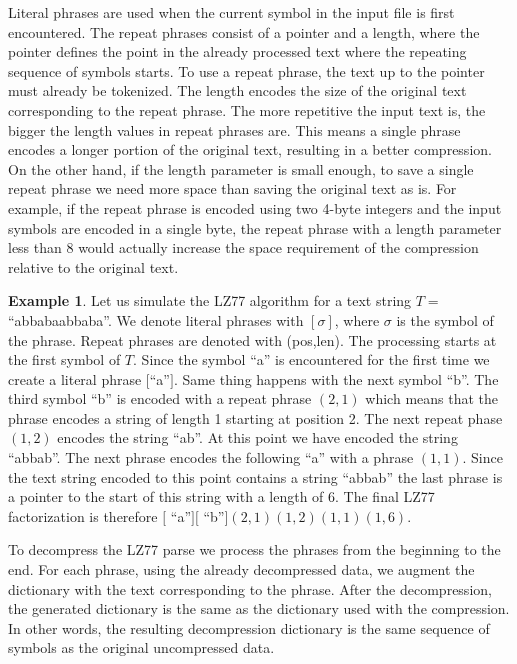 \documentclass[english,twoside,censored,csm,algorithms-track-2020]{HYthesisML}
\theoremstyle{plain}
\theoremstyle{definition}
\newtheorem{example}[theorem]{Example}
\begin{document}
Literal phrases are used when the current symbol in the input file is first encountered. The repeat
phrases consist of a pointer and a length, where the pointer defines the point in the already
processed text where the repeating sequence of symbols starts. To use a repeat phrase, the text up
to the pointer must already be tokenized.
The length encodes the size of the original text
corresponding to the repeat phrase. The more repetitive the input text is, the bigger the length
values in repeat phrases are. This means a single phrase encodes a longer portion of the original
text, resulting in a better compression. On the other hand, if the length parameter is small enough,
to save a single repeat phrase we need more space than saving the original text as is. For example,
if the repeat phrase is encoded using two 4-byte integers and the input symbols are encoded in a
single byte, the repeat phrase with a length parameter less than 8 would actually increase the
space requirement of the compression relative to the original text.

\begin{example}
  Let us simulate the LZ77 algorithm for a text string $T=$ ``abbabaabbaba''. We denote literal phrases
  with $[\sigma]$, where $\sigma$ is the symbol of the phrase. Repeat phrases are denoted
  with (pos,len). The processing starts
  at the first symbol of $T$. Since the symbol ``a'' is encountered for the first time we create a
  literal phrase $[$``a''$]$. Same thing happens with the next symbol ``b''. The third symbol ``b'' is
  encoded with a repeat phrase $(2,1)$ which means that the phrase encodes a string of length 1 starting
  at position 2. The next repeat phase $(1,2)$ encodes the string ``ab''. At this point we have encoded
  the string ``abbab''. The next phrase encodes the following ``a'' with a phrase $(1,1)$. Since
  the text string encoded to this point contains a string ``abbab'' the last phrase is a pointer
  to the start of this string with a length of 6. The final LZ77 factorization is therefore
  $[$ ``a''$][$ ``b''$](2,1)(1,2)(1,1)(1,6)$.
\end{example}

To decompress the LZ77 parse we process the phrases from the beginning to the end. For each
phrase, using the already decompressed data, we augment the dictionary with the text corresponding
to the phrase. After the decompression, the generated dictionary is the same as the dictionary used
with the compression. In other words, the resulting decompression dictionary is the same sequence
of symbols as the original uncompressed data. 
\end{document}
